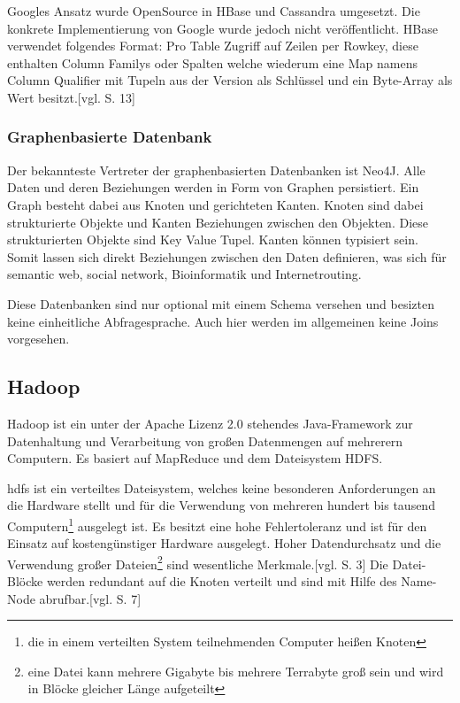 Googles Ansatz wurde OpenSource in HBase und Cassandra umgesetzt. Die konkrete Implementierung von Google wurde jedoch nicht veröffentlicht.
HBase verwendet folgendes Format: Pro Table Zugriff auf Zeilen per Rowkey, diese enthalten Column Familys oder Spalten welche wiederum eine Map namens Column Qualifier mit Tupeln aus der Version als Schlüssel und ein Byte-Array als Wert besitzt.[vgl. \cite{ba:dan} S. 13]

\subsubsection{Graphenbasierte Datenbank}

Der bekannteste Vertreter der graphenbasierten Datenbanken ist Neo4J.
Alle Daten und deren Beziehungen werden in Form von Graphen persistiert.
Ein Graph besteht dabei aus Knoten und gerichteten Kanten.
Knoten sind dabei strukturierte Objekte und Kanten Beziehungen zwischen den Objekten.
Diese strukturierten Objekte sind Key Value Tupel.
Kanten können typisiert sein.
Somit lassen sich direkt Beziehungen zwischen den Daten definieren, was sich für semantic web, social network, Bioinformatik und Internetrouting.

Diese Datenbanken sind nur optional mit einem Schema versehen und besizten keine einheitliche Abfragesprache.
Auch hier werden im allgemeinen keine Joins vorgesehen.


\subsection{Hadoop}

Hadoop ist ein unter der Apache Lizenz 2.0 stehendes Java-Framework zur Datenhaltung und Verarbeitung von großen Datenmengen auf mehrerern Computern.
Es basiert auf MapReduce und dem Dateisystem HDFS.

\Gls{hdfs} ist ein verteiltes Dateisystem, welches keine besonderen Anforderungen an die Hardware stellt und für die Verwendung von mehreren hundert bis tausend Computern\footnote{die in einem verteilten System teilnehmenden Computer heißen Knoten} ausgelegt ist.
Es besitzt eine hohe Fehlertoleranz und ist für den Einsatz auf kostengünstiger Hardware ausgelegt.
Hoher Datendurchsatz und die Verwendung großer Dateien\footnote{eine Datei kann mehrere Gigabyte bis mehrere Terrabyte groß sein und wird in Blöcke gleicher Länge aufgeteilt} sind wesentliche Merkmale.[vgl. \cite{paper:hadoop} S. 3]
Die Datei-Blöcke werden redundant auf die Knoten verteilt und sind mit Hilfe des Name-Node abrufbar.[vgl. \cite{ba:dan} S. 7]

